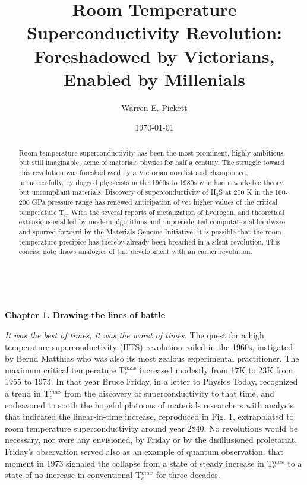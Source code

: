 \documentclass[aps,prb,twocolumn,groupedaddress]{revtex4}
\begin{document}
\title{Room Temperature Superconductivity Revolution: 
\\ Foreshadowed by Victorians,
  Enabled by Millenials}
\author{Warren E. Pickett}

\date{\today}
\begin{abstract}
Room temperature superconductivity has been the most prominent, highly ambitious, 
but still imaginable, acme of materials physics for half a century. The struggle
toward this revolution was foreshadowed by a Victorian novelist and championed,
unsuccessfully, by dogged physicists in the 1960s to 1980s who had a workable
theory but uncompliant materials. Discovery of superconductivity of H$_3$S at
200 K in the 160-200 GPa pressure range has renewed anticipation of yet higher
values of the critical temperature T$_c$. With the several reports of metalization
of hydrogen, and theoretical extensions enabled by modern algorithms and unprecedented
computational hardware and spurred forward by the Materials Genome Initiative, 
it is possible that the room temperature 
precipice has thereby already been breached in a silent revolution. 
This concise note draws analogies of this development with an earlier revolution. 
\end{abstract}
\maketitle

~
\vskip 5mm
\begin{center} {\bf Chapter 1. Drawing the lines of battle} \end{center}

{\it It was the best of times; it was the worst of times.}\cite{Dickens}
The quest for a 
high temperature superconductivity (HTS) revolution roiled in the 1960s, 
instigated by Bernd Matthias who was also its most zealous experimental practitioner. 
The maximum critical temperature T$_c^{max}$ increased modestly from 17K to 23K 
from 1955 to 1973. In that year Bruce Friday, in a letter to Physics 
Today,\cite{Friday} recognized a trend in T$_c^{max}$ from the 
discovery of superconductivity to that time, 
and endeavored to sooth the hopeful platoons of materials researchers with 
analysis that indicated the linear-in-time increase, reproduced in Fig. 1, 
extrapolated to room temperature 
superconductivity around year 2840. No revolutions would be necessary, nor were any 
envisioned, by Friday or by the disillusioned proletariat. Friday's observation served 
also as an example of quantum observation: that moment in 1973 signaled the collapse from a 
state of steady increase in T$_c^{max}$ to a state of no increase in conventional 
T$_c^{max}$ for three decades.\cite{Fullerides} 
\end{document}
